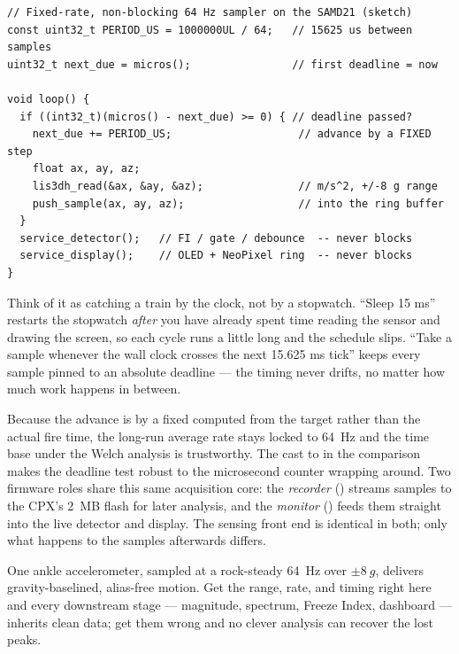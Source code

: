 \begin{lstlisting}[style=cpp]
// Fixed-rate, non-blocking 64 Hz sampler on the SAMD21 (sketch)
const uint32_t PERIOD_US = 1000000UL / 64;   // 15625 us between samples
uint32_t next_due = micros();                // first deadline = now

void loop() {
  if ((int32_t)(micros() - next_due) >= 0) { // deadline passed?
    next_due += PERIOD_US;                    // advance by a FIXED step
    float ax, ay, az;
    lis3dh_read(&ax, &ay, &az);               // m/s^2, +/-8 g range
    push_sample(ax, ay, az);                  // into the ring buffer
  }
  service_detector();   // FI / gate / debounce  -- never blocks
  service_display();    // OLED + NeoPixel ring  -- never blocks
}
\end{lstlisting}

\begin{intuition}
Think of it as catching a train by the clock, not by a stopwatch. ``Sleep 15 ms''
restarts the stopwatch \emph{after} you have already spent time reading the sensor and
drawing the screen, so each cycle runs a little long and the schedule slips. ``Take a
sample whenever the wall clock crosses the next 15.625 ms tick'' keeps every sample
pinned to an absolute deadline --- the timing never drifts, no matter how much work
happens in between.
\end{intuition}

Because the advance is by a fixed  computed from the target rather
than the actual fire time, the long-run average rate stays locked to \SI{64}{Hz} and
the time base under the Welch analysis is trustworthy. The cast to  in
the comparison makes the deadline test robust to the microsecond counter wrapping
around. Two firmware roles share this same acquisition core: the
\emph{recorder} () streams samples to the CPX's
\SI{2}{MB} flash for later analysis, and the \emph{monitor}
() feeds them straight into the live detector and
display. The sensing front end is identical in both; only what happens to the samples
afterwards differs.

\begin{takeaway}
One ankle accelerometer, sampled at a rock-steady \SI{64}{Hz} over $\pm\SI{8}{g}$,
delivers gravity-baselined, alias-free motion. Get the range, rate, and timing right
here and every downstream stage --- magnitude, spectrum, Freeze Index, dashboard ---
inherits clean data; get them wrong and no clever analysis can recover the lost peaks.
\end{takeaway}
